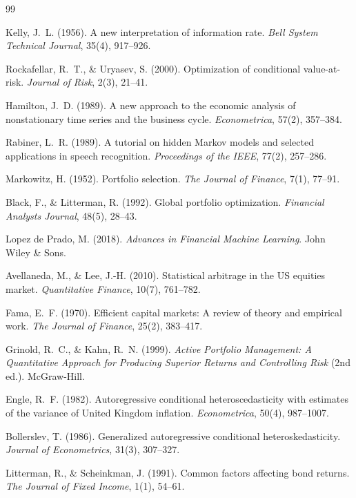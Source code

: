 \documentclass[12pt,openany]{book}
\numberwithin{equation}{chapter}
\theoremstyle{plain}
\theoremstyle{definition}
\theoremstyle{remark}
\begin{document}
\begin{thebibliography}{99}

Kelly, J.~L. (1956).
A new interpretation of information rate.
\textit{Bell System Technical Journal}, 35(4), 917--926.

Rockafellar, R.~T., \& Uryasev, S. (2000).
Optimization of conditional value-at-risk.
\textit{Journal of Risk}, 2(3), 21--41.

Hamilton, J.~D. (1989).
A new approach to the economic analysis of nonstationary time series and the business cycle.
\textit{Econometrica}, 57(2), 357--384.

Rabiner, L.~R. (1989).
A tutorial on hidden Markov models and selected applications in speech recognition.
\textit{Proceedings of the IEEE}, 77(2), 257--286.

Markowitz, H. (1952).
Portfolio selection.
\textit{The Journal of Finance}, 7(1), 77--91.

Black, F., \& Litterman, R. (1992).
Global portfolio optimization.
\textit{Financial Analysts Journal}, 48(5), 28--43.

Lopez de Prado, M. (2018).
\textit{Advances in Financial Machine Learning}.
John Wiley \& Sons.

Avellaneda, M., \& Lee, J.-H. (2010).
Statistical arbitrage in the US equities market.
\textit{Quantitative Finance}, 10(7), 761--782.

Fama, E.~F. (1970).
Efficient capital markets: A review of theory and empirical work.
\textit{The Journal of Finance}, 25(2), 383--417.

Grinold, R.~C., \& Kahn, R.~N. (1999).
\textit{Active Portfolio Management: A Quantitative Approach for Producing Superior Returns and Controlling Risk} (2nd ed.).
McGraw-Hill.

Engle, R.~F. (1982).
Autoregressive conditional heteroscedasticity with estimates of the variance of United Kingdom inflation.
\textit{Econometrica}, 50(4), 987--1007.

Bollerslev, T. (1986).
Generalized autoregressive conditional heteroskedasticity.
\textit{Journal of Econometrics}, 31(3), 307--327.

Litterman, R., \& Scheinkman, J. (1991).
Common factors affecting bond returns.
\textit{The Journal of Fixed Income}, 1(1), 54--61.


\end{thebibliography}
\end{document}
